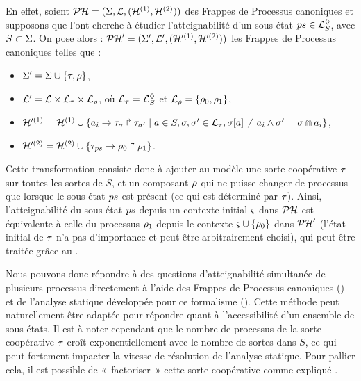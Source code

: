 En effet, soient $\mathcal{PH} = (\Sigma, \mathcal{L}, (\mathcal{H}^{(1)}, \mathcal{H}^{(2)}))$ des Frappes de Processus
canoniques et supposons que l'ont cherche à étudier l'atteignabilité d'un sous-état
${ps} \in \mathcal{L}^\lozenge_S$, avec $S \subset \Sigma$.
On pose alors : $\mathcal{PH}' = (\Sigma', \mathcal{L}', (\mathcal{H}'^{(1)}, \mathcal{H}'^{(2)}))$
les Frappes de Processus canoniques telles que :
\begin{itemize}
  \item $\Sigma' = \Sigma \cup \{ \tau, \rho \}$,
  \item $\mathcal{L}' = \mathcal{L} \times \mathcal{L}_\tau \times \mathcal{L}_\rho$, où
    $\mathcal{L}_\tau = \mathcal{L}^\lozenge_S$ et $\mathcal{L}_\rho = \{ \rho_0, \rho_1 \}$,
  \item $\mathcal{H}'^{(1)} = \mathcal{H}^{(1)} \cup
    \{ a_i\rightarrow\tau_\sigma\Rsh\tau_{\sigma'} \mid
    a \in S, \sigma, \sigma' \in \mathcal{L}_\tau,
    {\sigma[a]} \neq a_i \wedge \sigma' = \sigma \Cap a_i \}$,
  \item $\mathcal{H}'^{(2)} = \mathcal{H}^{(2)} \cup
    \{ \tau_{ps}\rightarrow\rho_0\Rsh\rho_1 \}$.
\end{itemize}
Cette transformation consiste donc à ajouter au modèle
une sorte coopérative $\tau$ sur toutes les sortes de $S$,
et un composant $\rho$ qui ne puisse changer de processus que lorsque le sous-état ${ps}$
est présent (ce qui est déterminé par $\tau$).
Ainsi, l'atteignabilité du sous-état ${ps}$ depuis un contexte initial $\varsigma$ dans $\mathcal{PH}$
est équivalente à celle du processus $\rho_1$ depuis le contexte
$\varsigma \cup \{ \rho_0 \}$ dans $\mathcal{PH}'$
(l'état initial de $\tau$ n'a pas d'importance et peut être arbitrairement choisi),
qui peut être traitée grâce au .

Nous pouvons donc répondre à des questions d'atteignabilité simultanée de plusieurs processus
directement à l'aide des Frappes de Processus canoniques ()
et de l'analyse statique développée pour ce formalisme ().
Cette méthode peut naturellement être adaptée pour répondre quant à
l'accessibilité d'un ensemble de sous-états.
Il est à noter cependant que le nombre de processus de la sorte coopérative $\tau$
croît exponentiellement avec le nombre de sortes dans $S$, ce qui peut fortement impacter
la vitesse de résolution de l'analyse statique.
Pour pallier cela, il est possible de «~factoriser~» cette sorte coopérative comme expliqué
.



